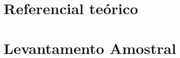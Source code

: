 \part{Referencial teórico}



\part{Levantamento Amostral}




%




\postextual





%

\printindex


